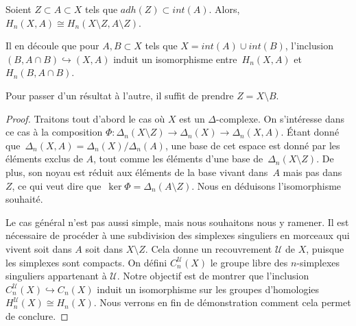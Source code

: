 \begin{theorem}\label{th:excision}
Soient $Z\subset A\subset X$ tels que $adh(Z)\subset int(A)$. Alors, ${H_n(X,A)\cong H_n(X\setminus Z,A\setminus Z)}$.

Il en découle que pour $A,B\subset X$ tels que $X=int(A)\cup int(B)$, l'inclusion $(B,A\cap B)\hookrightarrow(X,A)$ induit un isomorphisme entre~$H_n(X,A)$ et~$H_n(B, A\cap B)$.
\end{theorem}
\begin{remark}
Pour passer d'un résultat à l'autre, il suffit de prendre $Z=X\setminus B$.
\end{remark}
\begin{proof}
Traitons tout d'abord le cas où $X$ est un $\Delta$-complexe. On s'intéresse dans ce cas à la composition $\Phi:\Delta_n(X\setminus Z)\to \Delta_n(X)\to \Delta_n(X,A)$. Étant donné que~$\Delta_n(X,A)=\Delta_n(X)/\Delta_n(A)$, une base de cet espace est donné par les éléments exclus de $A$, tout comme les éléments d'une base de~$\Delta_n(X\setminus Z)$. De plus, son noyau est réduit aux éléments de la base vivant dans~$A$ mais pas dans $Z$, ce qui veut dire que~$\ker\Phi=\Delta_n(A\setminus Z)$. Nous en déduisons l'isomorphisme souhaité.

\bigskip Le cas général n'est pas aussi simple, mais nous souhaitons nous y ramener. Il est nécessaire de procéder à une subdivision des simplexes singuliers en morceaux qui vivent soit dans $A$ soit dans $X\setminus Z$. Cela donne un recouvrement $\mathcal{U}$ de $X$, puisque les simplexes sont compacts. On défini $C_n^\mathcal{U}(X)$ le groupe libre des $n$-simplexes singuliers appartenant à $\mathcal{U}$. Notre objectif est de montrer que l'inclusion $C_n^\mathcal{U}(X)\hookrightarrow C_n(X)$ induit un isomorphisme sur les groupes d'homologies~${H_n^\mathcal{U}(X)\cong H_n(X)}$. Nous verrons en fin de démonstration comment cela permet de conclure.


\end{proof}
